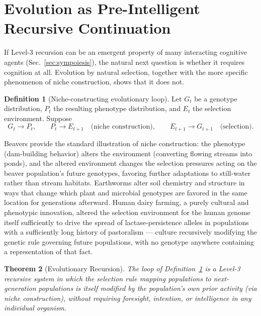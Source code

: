 \documentclass[11pt,a4paper]{article}
\theoremstyle{plain}
\newtheorem{theorem}{Theorem}[section]
\theoremstyle{definition}
\newtheorem{definition}[theorem]{Definition}
\theoremstyle{remark}
\begin{document}
\section{Evolution as Pre-Intelligent Recursive Continuation}
\label{sec:evolution}

If Level-3 recursion can be an emergent property of many interacting cognitive agents (Sec.~\ref{sec:sympoiesis}), the natural next question is whether it requires cognition at all. Evolution by natural selection, together with the more specific phenomenon of niche construction, shows that it does not.

\begin{definition}[Niche-constructing evolutionary loop]
\label{def:evolution-loop}
Let $G_t$ be a genotype distribution, $P_t$ the resulting phenotype distribution, and $E_t$ the selection environment. Suppose
\[
G_t \to P_t, \qquad P_t \to E_{t+1} \quad \text{(niche construction)}, \qquad E_{t+1} \to G_{t+1} \quad \text{(selection)}.
\]
\end{definition}

Beavers provide the standard illustration of niche construction: the phenotype (dam-building behavior) alters the environment (converting flowing streams into ponds), and the altered environment changes the selection pressures acting on the beaver population's future genotypes, favoring further adaptations to still-water rather than stream habitats. Earthworms alter soil chemistry and structure in ways that change which plant and microbial genotypes are favored in the same location for generations afterward. Human dairy farming, a purely cultural and phenotypic innovation, altered the selection environment for the human genome itself sufficiently to drive the spread of lactase-persistence alleles in populations with a sufficiently long history of pastoralism — culture recursively modifying the genetic rule governing future populations, with no genotype anywhere containing a representation of that fact.

\begin{theorem}[Evolutionary Recursion]
\label{thm:evolutionary-recursion}
The loop of Definition~\ref{def:evolution-loop} is a Level-3 recursive system in which the selection rule mapping populations to next-generation populations is itself modified by the population's own prior activity (via niche construction), without requiring foresight, intention, or intelligence in any individual organism.
\end{theorem}
\end{document}
